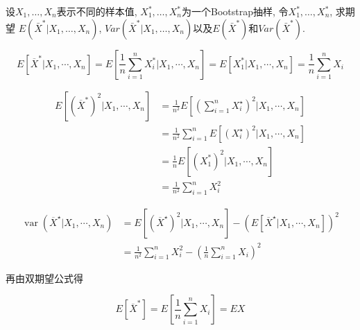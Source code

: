 \begin{problem}
设$X_1,\ldots,X_n$表示不同的样本值, $X_1^*,\ldots,X_n^*$为一个Bootstrap抽样, 令$X_1^*,\ldots,X_n^*$, 求期望 $E(\bar{X}^*|X_1,\ldots,X_n)$, $Var(\bar{X}^*|X_1,\ldots,X_n)$以及$E(\bar{X}^*)$和$Var(\bar{X}^*)$.
\end{problem}

\begin{solution}
    \begin{equation*}
        E\left[\overline{X}^{*} | X_{1}, \cdots, X_{n}\right]=E\left[\frac{1}{n} \sum_{i=1}^{n} X_{i}^{*} | X_{1}, \cdots, X_{n}\right]=E\left[X_{1}^{*} | X_{1}, \cdots, X_{n}\right]=\frac{1}{n} \sum_{i=1}^{n} X_{i}
    \end{equation*}

    \begin{equation*}
    \begin{aligned} E\left[\left(\overline{X}^{*}\right)^{2} | X_{1}, \cdots, X_{n}\right] &=\frac{1}{n^2} E\left[\left(\sum_{i=1}^{n} X_{i}^{\star}\right)^{2} | X_{1}, \cdots, X_{n}\right] \\ &=\frac{1}{n^2} \sum_{i=1}^{n} E\left[\left(X_{i}^{\star}\right)^{2} | X_{1}, \cdots, X_{n}\right] \\ &=\frac{1}{n} E\left[\left(X_{1}^{*}\right)^{2} | X_{1}, \cdots, X_{n}\right] \\ &=\frac{1}{n^2} \sum_{i=1}^{n} X_{i}^{2} \end{aligned}
    \end{equation*}

    \begin{equation*}
    \begin{aligned} \operatorname{var}\left(\overline{X}^{\star} | X_{1}, \cdots, X_{n}\right) &=E\left[\left(\overline{X}^{\star}\right)^{2} | X_{1}, \cdots, X_{n}\right]-\left(E\left[\overline{X}^{\star} | X_{1}, \cdots, X_{n}\right]\right)^{2} \\ &=\frac{1}{n^2} \sum_{i=1}^{n} X_{i}^{2}-\left(\frac{1}{n} \sum_{i=1}^{n} X_{i}\right)^{2} \end{aligned}
    \end{equation*}

    再由双期望公式得

    \begin{equation*}
        E\left[\overline{X}^{*}\right]=E\left[\frac{1}{n} \sum_{i=1}^{n} X_{i}\right]=E X
    \end{equation*}


\end{solution}
